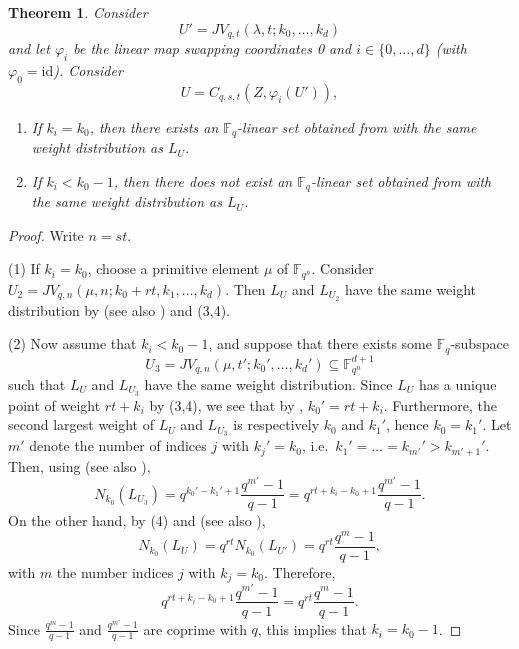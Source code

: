 \documentclass[11pt]{article}
\newtheorem{theorem}{Theorem}[section]
\theoremstyle{definition}
\newcommand{\fqn}{\mathbb{F}_{q^n}}
\newcommand{\F}{{\mathbb F}}
\newcommand{\fq}{{\mathbb F}_{q}}
\begin{document}
\begin{theorem} \label{th:relationweight}
Consider
\[
 U' = JV_{q,t}(\lambda,t;k_0,\dots,k_d)
\]
and let $\varphi_i$ be the linear map swapping coordinates 0 and $i \in \{0,\dots,d\}$ (with  $\varphi_0 = \mathrm{id}$).
Consider
\[
 U = C_{q,s,t}(Z,\varphi_i(U')),
\]
\begin{enumerate}[(1)]
 \item If $k_i = k_0$, then there exists an $\F_q$-linear set obtained from  with the same weight distribution as $L_U$.
 \item If $k_i < k_0-1$, then there does not exist an $\F_q$-linear set obtained from  with the same weight distribution as $L_U$.
\end{enumerate}
\end{theorem}
\begin{proof}
Write $n = st$.

(1) If $k_i = k_0$, choose a primitive element $\mu$ of $\fqn$.
Consider $U_2 = JV_{q,n}(\mu,n;k_0+rt,k_1,\dots,k_d)$.
Then $L_U$ and $L_{U_2}$ have the same weight distribution by  (see also \cite[Remark 2.19]{Jena2021onlinearsets}) and  (3,4).

(2) Now assume that $k_i < k_0-1$, and suppose that there exists some $\fq$-subspace
\[
 U_3 = JV_{q,n}(\mu,t';k_0',\dots,k_d') \subseteq \F_{q^n}^{d+1}
\]
such that $L_U$ and $L_{U_3}$ have the same weight distribution.
Since $L_U$ has a unique point of weight $r t + k_i$ by  (3,4), we see that by , $k_0' = r t + k_i$.
Furthermore, the second largest weight of $L_U$ and $L_{U_3}$ is respectively $k_0$ and $k_1'$, hence $k_0 = k_1'$.
Let $m'$ denote the number of indices $j$ with $k_j' = k_0$, i.e.\ $k_1' = \ldots = k_{m'}' > k_{m'+1}'$.
Then, using  (see also \cite[Remark 2.19]{Jena2021onlinearsets}),
\[
 N_{k_0}(L_{U_3}) = q^{k_0' - k_1' + 1}\frac{q^{m'}-1}{q-1} = q^{rt + k_i - k_0 + 1} \frac{q^{m'}-1}{q-1}.
\]
On the other hand, by  (4) and  (see also \cite[Remark 2.19]{Jena2021onlinearsets}),
\[
 N_{k_0}(L_U) = q^{rt} N_{k_0} (L_{U'}) = q^{rt} \frac{q^m-1}{q-1},
\]
with $m$ the number indices $j$ with $k_j = k_0$.
Therefore,
\[
 q^{rt + k_i - k_0 + 1} \frac{q^{m'}-1}{q-1} = q^{rt} \frac{q^m-1}{q-1}.
\]
Since $\frac{q^m-1}{q-1}$ and $\frac{q^{m'}-1}{q-1}$ are coprime with $q$, this implies that $k_i = k_0 - 1$.
\end{proof}
\end{document}
